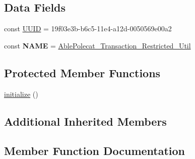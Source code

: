 \subsection*{Data Fields}
\begin{DoxyCompactItemize}
\item 
const \hyperlink{class_able_polecat___transaction___restricted___util_a74b892c8c0b86bf9d04c5819898c51e7}{U\+U\+I\+D} = \textquotesingle{}19f03e3b-\/b6c5-\/11e4-\/a12d-\/0050569e00a2\textquotesingle{}
\item 
\hypertarget{class_able_polecat___transaction___restricted___util_a244352f035b82b20b0efa506167fd862}{}const {\bfseries N\+A\+M\+E} = \textquotesingle{}\hyperlink{class_able_polecat___transaction___restricted___util}{Able\+Polecat\+\_\+\+Transaction\+\_\+\+Restricted\+\_\+\+Util}\textquotesingle{}\label{class_able_polecat___transaction___restricted___util_a244352f035b82b20b0efa506167fd862}

\end{DoxyCompactItemize}
\subsection*{Protected Member Functions}
\begin{DoxyCompactItemize}
\item 
\hyperlink{class_able_polecat___transaction___restricted___util_a91098fa7d1917ce4833f284bbef12627}{initialize} ()
\end{DoxyCompactItemize}
\subsection*{Additional Inherited Members}


\subsection{Member Function Documentation}
\hypertarget{class_able_polecat___transaction___restricted___util_abd12d28cbfdd5a45fba85bbac51a0b12}{}
